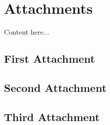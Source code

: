 
\chapter*{Attachments}
\hypertarget{attachments}{}  %

\setcounter{section}{0}
\renewcommand{\thesection}{\Alph{section}}


Content here...

\section{First Attachment}
\section{Second Attachment}
\section{Third Attachment}
